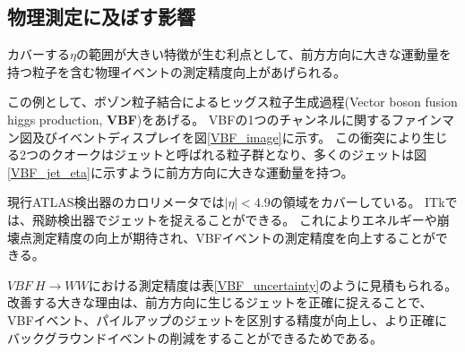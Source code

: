 \clearpage
\subsection{物理測定に及ぼす影響}
カバーする$\eta$の範囲が大きい特徴が生む利点として、前方方向に大きな運動量を持つ粒子を含む物理イベントの測定精度向上があげられる。

この例として、ボゾン粒子結合によるヒッグス粒子生成過程(Vector boson fusion higgs production, \textbf{VBF})をあげる。
VBFの1つのチャンネルに関するファインマン図及びイベントディスプレイを図\ref{VBF_image}に示す。
この衝突により生じる2つのクオークはジェットと呼ばれる粒子群となり、多くのジェットは図\ref{VBF_jet_eta}に示すように前方方向に大きな運動量を持つ。

現行ATLAS検出器のカロリメータでは$|\eta|<4.9$の領域をカバーしている。
ITkでは、飛跡検出器でジェットを捉えることができる。
これによりエネルギーや崩壊点測定精度の向上が期待され、VBFイベントの測定精度を向上することができる。

$VBF~H\rightarrow WW$における測定精度は表\ref{VBF_uncertainty}のように見積もられる\cite{1-3}。
改善する大きな理由は、前方方向に生じるジェットを正確に捉えることで、VBFイベント、パイルアップのジェットを区別する精度が向上し、より正確にバックグラウンドイベントの削減をすることができるためである。

